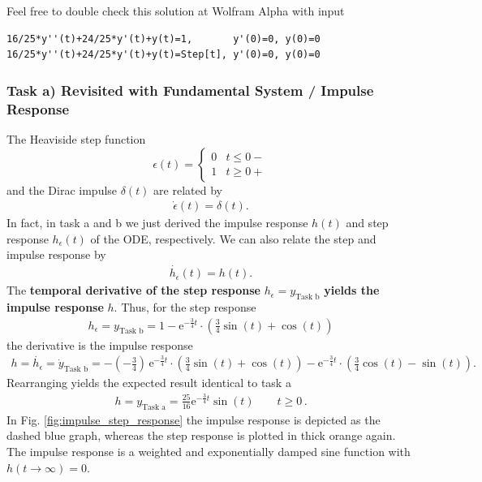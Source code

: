 Feel free to double check this solution at Wolfram Alpha with input
\begin{verbatim}
16/25*y''(t)+24/25*y'(t)+y(t)=1,       y'(0)=0, y(0)=0
16/25*y''(t)+24/25*y'(t)+y(t)=Step[t], y'(0)=0, y(0)=0
\end{verbatim}




\subsubsection{Task a) Revisited with Fundamental System / Impulse Response}
%
The Heaviside step function
\begin{equation}
\epsilon(t) =
\begin{cases}
  0 & t\leq 0-\\
  1 & t\geq 0+
\end{cases}
\end{equation}
and
the Dirac impulse $\delta(t)$ are related by
\begin{align}
\dot{\epsilon}(t) = \delta(t).
\end{align}
In fact, in task a and b we just derived the impulse response $h(t)$ and step response
$h_\epsilon(t)$ of the ODE, respectively.
%
We can also relate the step and impulse response by
\begin{align}
\dot{h_\epsilon}(t) = h(t).
\end{align}
%
The \textbf{temporal derivative of the step response} $h_\epsilon=y_\text{Task b}$
\textbf{yields the impulse response} $h$.
Thus, for the step response
\begin{align}
h_\epsilon = y_\text{Task b} =
1 - \mathrm{e}^{-\frac{3}{4} t} \cdot
\left( \frac{3}{4} \sin(t) + \cos(t)\right)
\end{align}
the derivative is the impulse response
\begin{align}
h = \dot{h_\epsilon} = \dot{y}_\text{Task b} =
 - (-\frac{3}{4})\,\mathrm{e}^{-\frac{3}{4} t} \cdot
\left( \frac{3}{4} \sin(t) + \cos(t)\right)
- \mathrm{e}^{-\frac{3}{4} t} \cdot
\left( \frac{3}{4} \cos(t) - \sin(t)\right).
\end{align}
Rearranging yields the expected result identical to task a
\begin{align}
\boxed{
h = y_\text{Task a} = \frac{25}{16} \mathrm{e}^{-\frac{3}{4} t} \sin(t) \qquad t\geq 0
}\,.
\end{align}
%
In Fig. \ref{fig:impulse_step_response} the impulse response is depicted as
the dashed blue graph, whereas the step response is plotted in thick
orange again.
The impulse response is a weighted and exponentially damped sine function
with $h(t\to\infty) = 0$.

